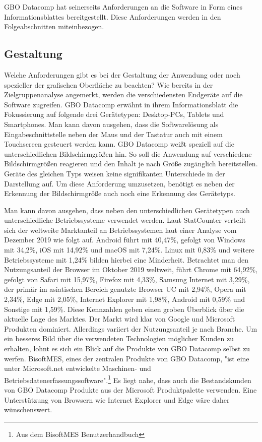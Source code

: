 GBO Datacomp hat seinerseits Anforderungen an die Software in Form eines Informationsblattes
bereitgestellt. Diese Anforderungen werden in den Folgeabschnitten miteinbezogen.

\subsection{Gestaltung}
\label{subsec:gestaltung}
Welche Anforderungen gibt es bei der Gestaltung der Anwendung oder noch spezieller 
der grafischen Oberfläche zu beachten? Wie bereits in der Zielgruppenanalyse
angemerkt, werden die verschiedensten Endgeräte auf die Software zugreifen.
GBO Datacomp erwähnt in ihrem Informationsblatt die Fokussierung auf folgende
drei Gerätetypen: Desktop-PCs, Tablets und Smartphones. Man kann davon ausgehen, dass die
Softwarelösung als Eingabeschnittstelle neben der Maus und der Tastatur auch mit einem Touchscreen
gesteuert werden kann. GBO Datacomp weißt speziell auf die unterschiedlichen Bildschirmgrößen
hin. So soll die Anwendung auf verschiedene Bildschirmgrößen reagieren und den Inhalt je nach
Größe zugänglich bereitstellen. Geräte des gleichen Typs weisen keine signifikanten Unterschiede
in der Darstellung auf. Um diese Anforderung umzusetzen, benötigt es neben der Erkennung
der Bildschirmgröße auch noch eine Erkennung des Gerätetyps.

Man kann davon ausgehen, dass neben den unterschiedlichen Gerätetypen auch unterschiedliche
Betriebssysteme verwendet werden. Laut StatCounter verteilt sich der weltweite Marktanteil
an Betriebssystemen laut einer Analyse vom Dezember 2019 wie folgt auf. Android führt mit
40,47\%, gefolgt von Windows mit 34,2\%, iOS mit 14,92\% und macOS mit 7,24\%. Linux mit 0,83\% und weitere
Betriebssysteme mit 1,24\% bilden hierbei eine Minderheit.\cite{StatCounterOSMarketShare} Betrachtet man den
Nutzungsanteil der Browser im Oktober 2019 weltweit, führt Chrome mit 64,92\%, gefolgt von Safari mit 15,97\%,
Firefox mit 4,33\%, Samsung Internet mit 3,29\%, der primär im asiatischen Bereich genutzte Browser UC
mit 2,94\%, Opera mit 2,34\%, Edge mit 2,05\%, Internet Explorer mit 1,98\%, Android mit 0,59\% und Sonstige mit 1,59\%.\cite{StatCounterBrowserMarketShare}
Diese Kennzahlen geben einen groben Überblick über die aktuelle Lage des Marktes. Der Markt wird klar von
Google und Microsoft Produkten dominiert. Allerdings variiert der Nutzungsanteil je nach Branche.
Um ein besseres Bild über die verwendeten Technologien möglicher Kunden zu erhalten,
lohnt es sich ein Blick auf die Produkte von GBO Datacomp selbst zu werfen.
BisoftMES, eines der zentralen Produkte von GBO Datacomp, "ist eine unter Microsoft.net
entwickelte Maschinen- und Betriebsdatenerfassungssoftware".\footnote{Aus dem BisoftMES Benutzerhandbuch\cite[S. 7]{BisoftMESHandbuch}}
Es liegt nahe, dass auch die Bestandskunden von GBO Datacomp Produkte aus der Microsoft
Produktpalette verwenden. Eine Unterstützung von Browsern wie Internet Explorer und Edge
wäre daher wünschenswert.

